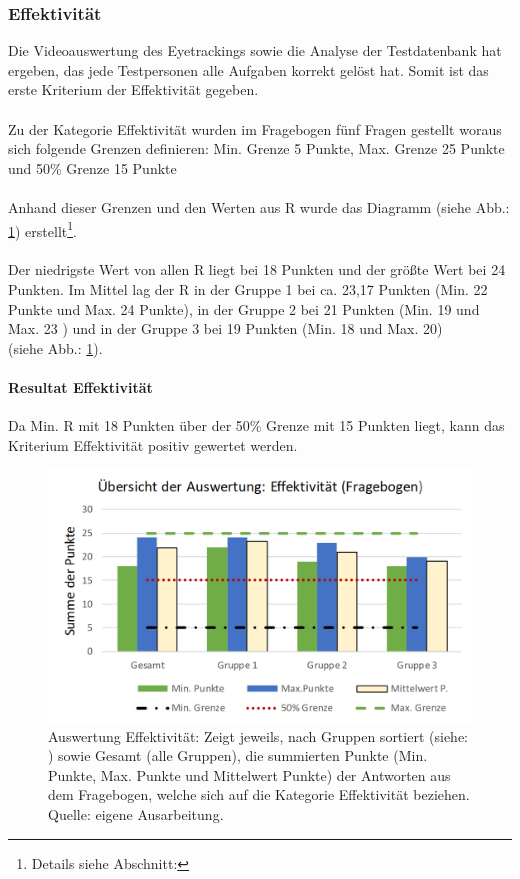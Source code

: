 \documentclass[Bachelorarbeit.tex]{subfiles}
\begin{document}
\subsubsection{Effektivität}
Die Videoauswertung des Eyetrackings sowie die Analyse der Testdatenbank hat ergeben, das jede Testpersonen alle Aufgaben korrekt gelöst hat. 
Somit ist das erste Kriterium der Effektivität gegeben.\\
\\
Zu der Kategorie Effektivität wurden im Fragebogen fünf Fragen gestellt woraus sich folgende Grenzen definieren: Min. Grenze 5 Punkte, Max. Grenze 25 Punkte und 50\% Grenze 15 Punkte\\
\\
Anhand dieser Grenzen und den Werten aus R wurde das Diagramm  (siehe Abb.: \ref{fig:AuswertungEffektivitaet}) erstellt\footnote{Details siehe Abschnitt: }.\\
\\
Der niedrigste Wert von allen R liegt bei 18 Punkten und der größte Wert bei 24 Punkten.
Im Mittel lag der R in der Gruppe 1 bei ca. 23,17 Punkten (Min. 22 Punkte und Max. 24 Punkte), in der Gruppe 2 bei 21 Punkten (Min. 19 und Max. 23 ) und in der Gruppe 3 bei 19 Punkten (Min. 18 und Max. 20)\\
(siehe Abb.: \ref{fig:AuswertungEffektivitaet}).

\paragraph{Resultat Effektivität} Da Min. R mit 18 Punkten über der 50\% Grenze mit 15 Punkten liegt, kann das Kriterium Effektivität positiv gewertet werden.


\begin{figure}[H]
\centering
\includegraphics[width=0.9\linewidth]{img/Evaluation/Usability/AuswertungEffektivitaet}
\caption[Übersicht der Effektivität]{
	Auswertung Effektivität: Zeigt jeweils, nach Gruppen sortiert (siehe: ) sowie Gesamt (alle Gruppen), die summierten Punkte (Min. Punkte, Max. Punkte und Mittelwert Punkte) der Antworten aus dem Fragebogen, welche sich auf die Kategorie Effektivität beziehen. Quelle: eigene Ausarbeitung.
	}
\label{fig:AuswertungEffektivitaet}
\end{figure}
\end{document}
